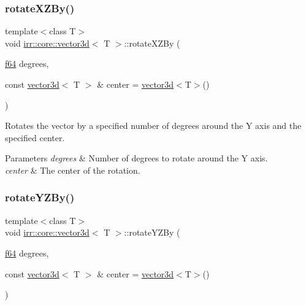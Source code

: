 \subsubsection{\texorpdfstring{rotate\+X\+Z\+By()}{rotateXZBy()}}
{\footnotesize\ttfamily template$<$class T$>$ \\
void \hyperlink{classirr_1_1core_1_1vector3d}{irr\+::core\+::vector3d}$<$ T $>$\+::rotate\+X\+Z\+By (\begin{DoxyParamCaption}\item[{\hyperlink{namespaceirr_a1325b02603ad449f92c68fc640af9b28}{f64}}]{degrees,  }\item[{const \hyperlink{classirr_1_1core_1_1vector3d}{vector3d}$<$ T $>$ \&}]{center = {\ttfamily \hyperlink{classirr_1_1core_1_1vector3d}{vector3d}$<$T$>$()} }\end{DoxyParamCaption})\hspace{0.3cm}{\ttfamily [inline]}}



Rotates the vector by a specified number of degrees around the Y axis and the specified center. 


\begin{DoxyParams}{Parameters}
{\em degrees} & Number of degrees to rotate around the Y axis. \\
\hline
{\em center} & The center of the rotation. \\
\hline
\end{DoxyParams}
\mbox{\label{classirr_1_1core_1_1vector3d_aaa048312f75f152861479cb48e2ddfe4}} 
\subsubsection{\texorpdfstring{rotate\+Y\+Z\+By()}{rotateYZBy()}}
{\footnotesize\ttfamily template$<$class T$>$ \\
void \hyperlink{classirr_1_1core_1_1vector3d}{irr\+::core\+::vector3d}$<$ T $>$\+::rotate\+Y\+Z\+By (\begin{DoxyParamCaption}\item[{\hyperlink{namespaceirr_a1325b02603ad449f92c68fc640af9b28}{f64}}]{degrees,  }\item[{const \hyperlink{classirr_1_1core_1_1vector3d}{vector3d}$<$ T $>$ \&}]{center = {\ttfamily \hyperlink{classirr_1_1core_1_1vector3d}{vector3d}$<$T$>$()} }\end{DoxyParamCaption})\hspace{0.3cm}{\ttfamily [inline]}}



